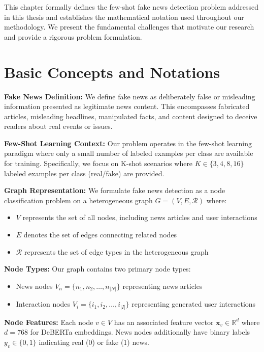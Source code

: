 
This chapter formally defines the few-shot fake news detection problem addressed in this thesis and establishes the mathematical notation used throughout our methodology. We present the fundamental challenges that motivate our research and provide a rigorous problem formulation.

\section{Basic Concepts and Notations}

\textbf{Fake News Definition:} We define fake news as deliberately false or misleading information presented as legitimate news content. This encompasses fabricated articles, misleading headlines, manipulated facts, and content designed to deceive readers about real events or issues.

\textbf{Few-Shot Learning Context:} Our problem operates in the few-shot learning paradigm where only a small number of labeled examples per class are available for training. Specifically, we focus on K-shot scenarios where $K \in \{3, 4, 8, 16\}$ labeled examples per class (real/fake) are provided.

\textbf{Graph Representation:} We formulate fake news detection as a node classification problem on a heterogeneous graph $G = (V, E, \mathcal{R})$ where:
\begin{itemize}
\item $V$ represents the set of all nodes, including news articles and user interactions
\item $E$ denotes the set of edges connecting related nodes  
\item $\mathcal{R}$ represents the set of edge types in the heterogeneous graph
\end{itemize}

\textbf{Node Types:} Our graph contains two primary node types:
\begin{itemize}
\item News nodes $V_n = \{n_1, n_2, \ldots, n_{|N|}\}$ representing news articles
\item Interaction nodes $V_i = \{i_1, i_2, \ldots, i_{|I|}\}$ representing generated user interactions
\end{itemize}

\textbf{Node Features:} Each node $v \in V$ has an associated feature vector $\mathbf{x}_v \in \mathbb{R}^d$ where $d = 768$ for DeBERTa embeddings. News nodes additionally have binary labels $y_v \in \{0, 1\}$ indicating real (0) or fake (1) news.

